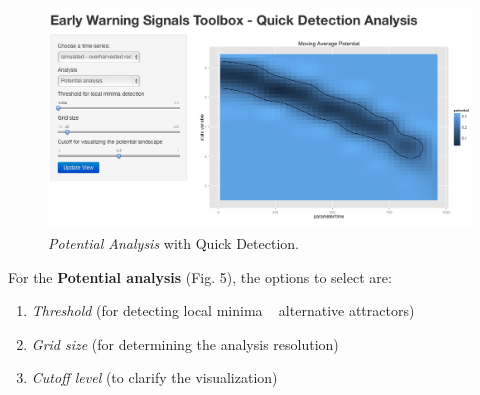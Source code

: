 \documentclass[12pt,a4paper,final]{article}
\begin{document}
\begin{doublespacing}
\newpage
\begin{figure}[ht]
\begin{center}
\includegraphics[scale=0.4]{demo_potential.png}
\caption{\textit{Potential Analysis} with Quick Detection.}
\end{center}
\end{figure}

For the \textbf{Potential analysis} (Fig. 5), the options to select are:
\begin{enumerate}
\item \textit{Threshold} (for detecting local minima ~ alternative attractors)
\item \textit{Grid size} (for determining the analysis resolution)
\item \textit{Cutoff level} (to clarify the visualization)
\end{enumerate}

\end{doublespacing}
\end{document}
